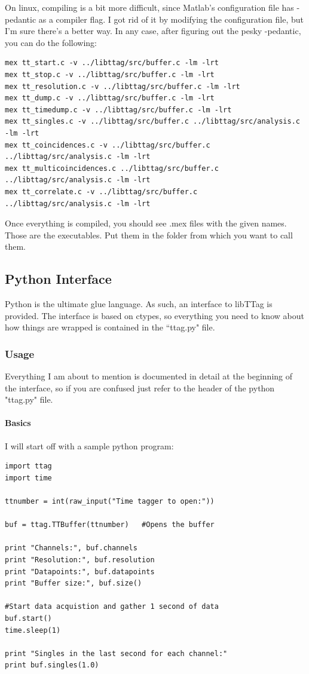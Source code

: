 \documentclass[10pt]{article}
\begin{document}
On linux, compiling is a bit more difficult, since Matlab's configuration file has -pedantic as a compiler flag.
I got rid of it by  modifying the configuration file, but I'm sure there's a better way. In any case, after figuring
out the pesky -pedantic, you can do the following:

\begin{verbatim}
mex tt_start.c -v ../libttag/src/buffer.c -lm -lrt
mex tt_stop.c -v ../libttag/src/buffer.c -lm -lrt
mex tt_resolution.c -v ../libttag/src/buffer.c -lm -lrt
mex tt_dump.c -v ../libttag/src/buffer.c -lm -lrt
mex tt_timedump.c -v ../libttag/src/buffer.c -lm -lrt
mex tt_singles.c -v ../libttag/src/buffer.c ../libttag/src/analysis.c -lm -lrt
mex tt_coincidences.c -v ../libttag/src/buffer.c ../libttag/src/analysis.c -lm -lrt
mex tt_multicoincidences.c ../libttag/src/buffer.c ../libttag/src/analysis.c -lm -lrt
mex tt_correlate.c -v ../libttag/src/buffer.c ../libttag/src/analysis.c -lm -lrt
\end{verbatim}

Once everything is compiled, you should see .mex files with the given names. Those are the executables. Put them in the folder
from which you want to call them.

\subsection{Python Interface}

Python is the ultimate glue language. As such, an interface to libTTag is provided. The interface is based on ctypes, so everything you need to know about how things are wrapped
is contained in the ``ttag.py" file. 

\subsubsection{Usage}

Everything I am about to mention is documented in detail at the beginning of the interface, so if you are confused just refer to the header of the python "ttag.py" file.

\paragraph{Basics}

I will start off with a sample python program:

\begin{verbatim}
import ttag
import time

ttnumber = int(raw_input("Time tagger to open:"))

buf = ttag.TTBuffer(ttnumber)   #Opens the buffer

print "Channels:", buf.channels
print "Resolution:", buf.resolution
print "Datapoints:", buf.datapoints
print "Buffer size:", buf.size()

#Start data acquistion and gather 1 second of data
buf.start()
time.sleep(1)

print "Singles in the last second for each channel:"
print buf.singles(1.0)

\end{verbatim}
\end{document}
